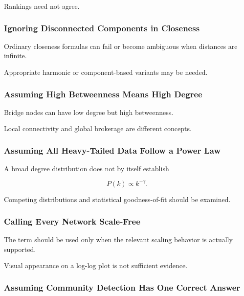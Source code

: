 Rankings need not agree.

\subsubsection{Ignoring Disconnected Components in Closeness}

Ordinary closeness formulas can fail or become ambiguous when distances are
infinite.

Appropriate harmonic or component-based variants may be needed.

\subsubsection{Assuming High Betweenness Means High Degree}

Bridge nodes can have low degree but high betweenness.

Local connectivity and global brokerage are different concepts.

\subsubsection{Assuming All Heavy-Tailed Data Follow a Power Law}

A broad degree distribution does not by itself establish

\[
P(k)\propto k^{-\gamma}.
\]

Competing distributions and statistical goodness-of-fit should be examined.

\subsubsection{Calling Every Network Scale-Free}

The term should be used only when the relevant scaling behavior is actually
supported.

Visual appearance on a log-log plot is not sufficient evidence.

\subsubsection{Assuming Community Detection Has One Correct Answer}

